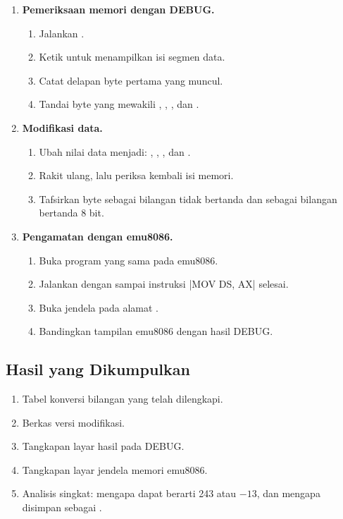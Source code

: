 \begin{enumerate}
    \item \textbf{Pemeriksaan memori dengan DEBUG.}
    \begin{enumerate}
        \item Jalankan .
        \item Ketik  untuk menampilkan isi segmen data.
        \item Catat delapan byte pertama yang muncul.
        \item Tandai byte yang mewakili , ,
              , dan .
    \end{enumerate}

    \item \textbf{Modifikasi data.}
    \begin{enumerate}
        \item Ubah nilai data menjadi:
              , ,
              , dan .
        \item Rakit ulang, lalu periksa kembali isi memori.
        \item Tafsirkan byte  sebagai bilangan tidak bertanda
              dan sebagai bilangan bertanda 8 bit.
    \end{enumerate}

    \item \textbf{Pengamatan dengan emu8086.}
    \begin{enumerate}
        \item Buka program yang sama pada emu8086.
        \item Jalankan dengan  sampai instruksi
              \lstasm|MOV DS, AX| selesai.
        \item Buka jendela  pada alamat .
        \item Bandingkan tampilan emu8086 dengan hasil DEBUG.
    \end{enumerate}
\end{enumerate}

\subsection{Hasil yang Dikumpulkan}

\begin{enumerate}
    \item Tabel konversi bilangan yang telah dilengkapi.
    \item Berkas  versi modifikasi.
    \item Tangkapan layar hasil  pada DEBUG.
    \item Tangkapan layar jendela memori emu8086.
    \item Analisis singkat: mengapa  dapat berarti 243 atau
          $-13$, dan mengapa  disimpan sebagai .
\end{enumerate}

